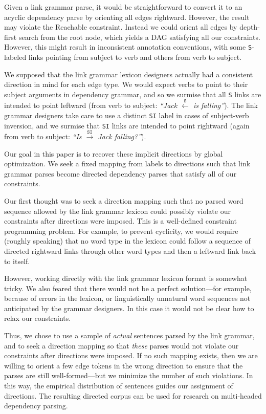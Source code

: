 \documentclass[11pt]{article}
\begin{document}
Given a link grammar parse, it would be straightforward to convert it to an acyclic dependency parse by orienting all edges rightward.  However, the result may violate the {\sc Reachable} constraint.  Instead we could orient all edges by depth-first search from the root node, which yields a DAG satisfying all our constraints.  However, this might result in inconsistent annotation conventions, with some \texttt{S}-labeled links pointing from subject to verb and others from verb to subject.  

We supposed that the link grammar lexicon designers actually had a consistent direction in mind for each edge type.  We would expect verbs to point to their subject arguments in dependency grammar, and so we surmise that all \texttt{S} links are intended to point leftward (from verb to subject: {\em ``Jack $\stackrel{\texttt{S}}{\leftarrow}$ is falling''}).  The link grammar designers take care to use a distinct \texttt{SI} label in cases of subject-verb inversion, and we surmise that \texttt{SI} links are intended to point rightward (again from verb to subject: {\em ``Is $\stackrel{\texttt{SI}}{\rightarrow}$ Jack falling?''}).

Our goal in this paper is to recover these implicit directions by global optimization.  We seek a fixed mapping from labels to directions such that link grammar parses become directed dependency parses that satisfy all of our constraints.

Our first thought was to seek a direction mapping such that no parsed word sequence allowed by the link grammar lexicon could possibly violate our constraints after directions were imposed.  This is a well-defined constraint programming problem.  For example, to prevent cyclicity, we would require (roughly speaking) that no word type in the lexicon could follow a sequence of directed rightward links through other word types and then a leftward link back to itself.  

However, working directly with the link grammar lexicon format is somewhat tricky.  We also feared that there would not be a perfect solution---for example, because of errors in the lexicon, or linguistically unnatural word sequences not anticipated by the grammar designers.  In this case it would not be clear how to relax our constraints.

Thus, we chose to use a sample of {\em actual} sentences parsed by the link grammar, and to seek a direction mapping so that {\em these} parses would not violate our constraints after directions were imposed.  If no such mapping exists, then we are willing to orient a few edge tokens in the wrong direction to ensure that the parses are still well-formed---but we minimize the number of such violations.  In this way, the empirical distribution of sentences guides our assignment of directions.  The resulting directed corpus can be used for research on multi-headed dependency parsing.
\end{document}
